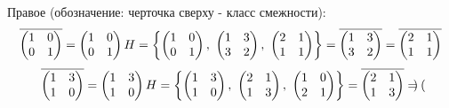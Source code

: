 \documentclass[11pt, fleqn]{article}
\begin{document}
\begin{enumerate}
      Правое (обозначение: черточка сверху - класс смежности):
      \[\overline{\begin{pmatrix}
          1 & 0\\
          0 & 1
      \end{pmatrix}} = \begin{pmatrix}
          1 & 0\\
          0 & 1
      \end{pmatrix} H = \left\{ \begin{pmatrix}
          1 & 0\\
          0 & 1
      \end{pmatrix},\ \begin{pmatrix}
          1 & 3\\
          3 & 2
      \end{pmatrix},\ \begin{pmatrix}
          2 & 1\\
          1 & 1
      \end{pmatrix} \right\} = \overline{\begin{pmatrix}
          1 & 3\\
          3 & 2
      \end{pmatrix}} = \overline{\begin{pmatrix}
          2 & 1\\
          1 & 1
      \end{pmatrix}}\]
      \[\overline{\begin{pmatrix}
          1 & 3\\
          1 & 0
      \end{pmatrix}} = \begin{pmatrix}
          1 & 3\\
          1 & 0
      \end{pmatrix} H = \left\{ \begin{pmatrix}
          1 & 3\\
          1 & 0
      \end{pmatrix},\ \begin{pmatrix}
          2 & 1\\
          1 & 3
      \end{pmatrix},\ \begin{pmatrix}
          1 & 0\\
          2 & 1
      \end{pmatrix} \right\} = \overline{\begin{pmatrix}
          2 & 1\\
          1 & 3
      \end{pmatrix}} = \overline{\begin{pmatrix}

\end{pmatrix}}\]
\end{enumerate}
\end{document}
